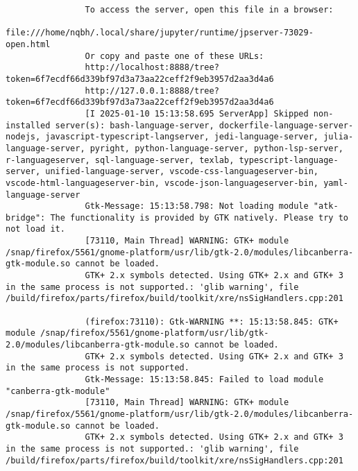 \documentclass{article}
\begin{document}
\begin{itemize}
\begin{itemize}
\begin{itemize}
\begin{verbatim}
				To access the server, open this file in a browser:
				file:///home/nqbh/.local/share/jupyter/runtime/jpserver-73029-open.html
				Or copy and paste one of these URLs:
				http://localhost:8888/tree?token=6f7ecdf66d339bf97d3a73aa22ceff2f9eb3957d2aa3d4a6
				http://127.0.0.1:8888/tree?token=6f7ecdf66d339bf97d3a73aa22ceff2f9eb3957d2aa3d4a6
				[I 2025-01-10 15:13:58.695 ServerApp] Skipped non-installed server(s): bash-language-server, dockerfile-language-server-nodejs, javascript-typescript-langserver, jedi-language-server, julia-language-server, pyright, python-language-server, python-lsp-server, r-languageserver, sql-language-server, texlab, typescript-language-server, unified-language-server, vscode-css-languageserver-bin, vscode-html-languageserver-bin, vscode-json-languageserver-bin, yaml-language-server
				Gtk-Message: 15:13:58.798: Not loading module "atk-bridge": The functionality is provided by GTK natively. Please try to not load it.
				[73110, Main Thread] WARNING: GTK+ module /snap/firefox/5561/gnome-platform/usr/lib/gtk-2.0/modules/libcanberra-gtk-module.so cannot be loaded.
				GTK+ 2.x symbols detected. Using GTK+ 2.x and GTK+ 3 in the same process is not supported.: 'glib warning', file /build/firefox/parts/firefox/build/toolkit/xre/nsSigHandlers.cpp:201
				
				(firefox:73110): Gtk-WARNING **: 15:13:58.845: GTK+ module /snap/firefox/5561/gnome-platform/usr/lib/gtk-2.0/modules/libcanberra-gtk-module.so cannot be loaded.
				GTK+ 2.x symbols detected. Using GTK+ 2.x and GTK+ 3 in the same process is not supported.
				Gtk-Message: 15:13:58.845: Failed to load module "canberra-gtk-module"
				[73110, Main Thread] WARNING: GTK+ module /snap/firefox/5561/gnome-platform/usr/lib/gtk-2.0/modules/libcanberra-gtk-module.so cannot be loaded.
				GTK+ 2.x symbols detected. Using GTK+ 2.x and GTK+ 3 in the same process is not supported.: 'glib warning', file /build/firefox/parts/firefox/build/toolkit/xre/nsSigHandlers.cpp:201
				

\end{verbatim}
\end{itemize}
\end{itemize}
\end{itemize}
\end{document}
